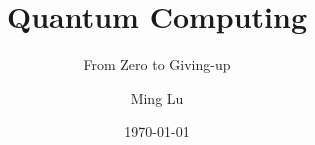 \documentclass{beamer}
\title{Quantum Computing}
\subtitle{From Zero to Giving-up}
\author{Ming Lu}
\date{\today}
\begin{document}

\def\w{\ar@{-}[l]}
\def\W{\ar@{=}[l]}


\def\A#1{\save []="#1" \restore}


\def\op#1{*+[F]{\rule[-0.2ex]{0ex}{2.1ex}#1}}	%
\def\b{*={\bullet}}
\def\o{*={\oplus}}
\def\t{*={\times}}				%
\def\sq{*=<6pt,6pt>[F]{}}			%
\def\m#1{\left[\matrix{#1}\right]}		%
\def\z{*+[]{\rule[-0.2ex]{0ex}{2.1ex}~|0\>}}	%
\def\discard{*[]{\rule[-0.2ex]{0.75pt}{2.1ex}~}}	%
\def\slash{*={/}}				%


\def\N{*-{}\W}
\def\n{*-{}\w}


\def\>{\rangle}
\def\<{\langle}
\def\ua{\uparrow}

\def\meter{*+[]{\put(-3,0){\texttt{[image: meter.epsf]}}~~~~}%
		\ar@{-}[l]}


\def\q#1{*+{\rule[-0.2ex]{0ex}{2.1ex}|#1\>}}
\def\qv#1#2{*+{\rule[-0.2ex]{0ex}{2.1ex}|#1\>=|#2\>}}
	


\def\gspace#1{*+{\rule[-0.2ex]{0ex}{2.1ex}%
	\setbox\sbox=\hbox{$#1$}%
	\hspace*{\wd\sbox}}}

\def\gnqubit#1#2{\gspace{#1}
		 \save [].[#2]!C="qq"*[F]\frm{}\restore
		 \save "qq"*[]{#1} \restore}
\end{document}
